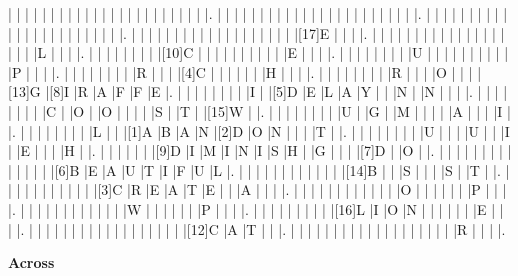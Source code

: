 \documentclass{article}
\begin{document}
\begin{Puzzle}{23}{23}
	|{}	|{}	|{}	|{}	|{}	|{}	|{}	|{}	|{}	|{}	|{}	|{}	|{}	|{}	|{}	|{}	|{}	|{}	|{}	|{}	|{}	|{}	|{}	|.
	|{}	|{}	|{}	|{}	|{}	|{}	|{}	|{}	|{}	|{}	|{}	|{}	|{}	|{}	|{}	|{}	|{}	|{}	|{}	|{}	|{}	|{}	|{}	|.
	|{}	|{}	|{}	|{}	|{}	|{}	|{}	|{}	|{}	|{}	|{}	|{}	|{}	|{}	|{}	|{}	|{}	|{}	|{}	|{}	|{}	|{}	|{}	|.
	|{}	|{}	|{}	|{}	|{}	|{}	|{}	|{}	|{}	|{}	|{}	|{}	|{}	|{}	|{}	|{}	|{}	|{}	|{}	|[17]E	|{}	|{}	|{}	|.
	|{}	|{}	|{}	|{}	|{}	|{}	|{}	|{}	|{}	|{}	|{}	|{}	|{}	|{}	|{}	|{}	|{}	|{}	|{}	|L	|{}	|{}	|{}	|.
	|{}	|{}	|{}	|{}	|{}	|{}	|{}	|{}	|[10]C	|{}	|{}	|{}	|{}	|{}	|{}	|{}	|{}	|{}	|{}	|E	|{}	|{}	|{}	|.
	|{}	|{}	|{}	|{}	|{}	|{}	|{}	|{}	|U	|{}	|{}	|{}	|{}	|{}	|{}	|{}	|{}	|{}	|{}	|P	|{}	|{}	|{}	|.
	|{}	|{}	|{}	|{}	|{}	|{}	|{}	|{}	|R	|{}	|{}	|{}	|[4]C	|{}	|{}	|{}	|{}	|{}	|{}	|H	|{}	|{}	|{}	|.
	|{}	|{}	|{}	|{}	|{}	|{}	|{}	|{}	|R	|{}	|{}	|{}	|O	|{}	|{}	|{}	|[13]G	|[8]I	|R	|A	|F	|F	|E	|.
	|{}	|{}	|{}	|{}	|{}	|{}	|{}	|{}	|I	|{}	|[5]D	|E	|L	|A	|Y	|{}	|{}	|N	|{}	|N	|{}	|{}	|{}	|.
	|{}	|{}	|{}	|{}	|{}	|{}	|{}	|{}	|C	|{}	|O	|{}	|O	|{}	|{}	|{}	|{}	|S	|{}	|T	|{}	|[15]W	|{}	|.
	|{}	|{}	|{}	|{}	|{}	|{}	|{}	|{}	|U	|{}	|G	|{}	|M	|{}	|{}	|{}	|{}	|A	|{}	|{}	|{}	|I	|{}	|.
	|{}	|{}	|{}	|{}	|{}	|{}	|{}	|{}	|L	|{}	|{}	|[1]A	|B	|A	|N	|[2]D	|O	|N	|{}	|{}	|{}	|T	|{}	|.
	|{}	|{}	|{}	|{}	|{}	|{}	|{}	|{}	|U	|{}	|{}	|{}	|U	|{}	|{}	|I	|{}	|E	|{}	|{}	|{}	|H	|{}	|.
	|{}	|{}	|{}	|{}	|{}	|{}	|[9]D	|I	|M	|I	|N	|I	|S	|H	|{}	|G	|{}	|{}	|{}	|[7]D	|{}	|O	|{}	|.
	|{}	|{}	|{}	|{}	|{}	|{}	|{}	|{}	|{}	|{}	|{}	|{}	|{}	|{}	|[6]B	|E	|A	|U	|T	|I	|F	|U	|L	|.
	|{}	|{}	|{}	|{}	|{}	|{}	|{}	|{}	|{}	|{}	|{}	|{}	|[14]B	|{}	|{}	|S	|{}	|{}	|{}	|S	|{}	|T	|{}	|.
	|{}	|{}	|{}	|{}	|{}	|{}	|{}	|{}	|{}	|{}	|{}	|[3]C	|R	|E	|A	|T	|E	|{}	|{}	|A	|{}	|{}	|{}	|.
	|{}	|{}	|{}	|{}	|{}	|{}	|{}	|{}	|{}	|{}	|{}	|{}	|O	|{}	|{}	|{}	|{}	|{}	|{}	|P	|{}	|{}	|{}	|.
	|{}	|{}	|{}	|{}	|{}	|{}	|{}	|{}	|{}	|{}	|{}	|{}	|W	|{}	|{}	|{}	|{}	|{}	|{}	|P	|{}	|{}	|{}	|.
	|{}	|{}	|{}	|{}	|{}	|{}	|{}	|{}	|{}	|[16]L	|I	|O	|N	|{}	|{}	|{}	|{}	|{}	|{}	|E	|{}	|{}	|{}	|.
	|{}	|{}	|{}	|{}	|{}	|{}	|{}	|{}	|{}	|{}	|{}	|{}	|{}	|{}	|{}	|{}	|{}	|{}	|[12]C	|A	|T	|{}	|{}	|.
	|{}	|{}	|{}	|{}	|{}	|{}	|{}	|{}	|{}	|{}	|{}	|{}	|{}	|{}	|{}	|{}	|{}	|{}	|{}	|R	|{}	|{}	|{}	|.
\end{Puzzle}


\begin{PuzzleClues}{\textbf{Across}}

\end{PuzzleClues}
\end{document}
